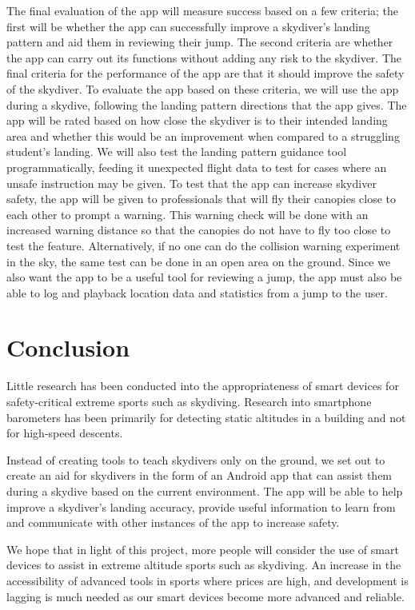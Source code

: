 \documentclass[11pt, a4paper, twocolumn]{article}
\begin{document}
The final evaluation of the app will measure success based on a few criteria; the first will be whether the app can successfully improve a skydiver's landing pattern and aid them in reviewing their jump. The second criteria are whether the app can carry out its functions without adding any risk to the skydiver. The final criteria for the performance of the app are that it should improve the safety of the skydiver. To evaluate the app based on these criteria, we will use the app during a skydive, following the landing pattern directions that the app gives. The app will be rated based on how close the skydiver is to their intended landing area and whether this would be an improvement when compared to a struggling student's landing. We will also test the landing pattern guidance tool programmatically, feeding it unexpected flight data to test for cases where an unsafe instruction may be given. To test that the app can increase skydiver safety, the app will be given to professionals that will fly their canopies close to each other to prompt a warning. This warning check will be done with an increased warning distance so that the canopies do not have to fly too close to test the feature. Alternatively, if no one can do the collision warning experiment in the sky, the same test can be done in an open area on the ground. Since we also want the app to be a useful tool for reviewing a jump, the app must also be able to log and playback location data and statistics from a jump to the user.

\section{Conclusion}\label{sec:conclusion} %

Little research has been conducted into the appropriateness of smart devices for safety-critical extreme sports such as skydiving. Research into smartphone barometers has been primarily for detecting static altitudes in a building and not for high-speed descents.

Instead of creating tools to teach skydivers only on the ground, we set out to create an aid for skydivers in the form of an Android app that can assist them during a skydive based on the current environment. The app will be able to help improve a skydiver's landing accuracy, provide useful information to learn from and communicate with other instances of the app to increase safety.


We hope that in light of this project, more people will consider the use of smart devices to assist in extreme altitude sports such as skydiving. An increase in the accessibility of advanced tools in sports where prices are high, and development is lagging is much needed as our smart devices become more advanced and reliable.

\printbibliography{}
\end{document}
